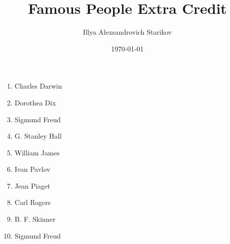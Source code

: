 \documentclass[12pt]{article}
\title{Famous People Extra Credit}
\date{\today}
\author{Illya Alexsandrovich Starikov}
\begin{document}
\maketitle

\begin{enumerate}
    \item Charles Darwin
    \item Dorothea Dix
    \item Sigmund Freud
    \item G. Stanley Hall
    \item William James
    \item Ivan Pavlov
    \item Jean Piaget
    \item Carl Rogers
    \item B. F. Skinner
    \item Sigmund Freud
\end{enumerate}
\end{document}
